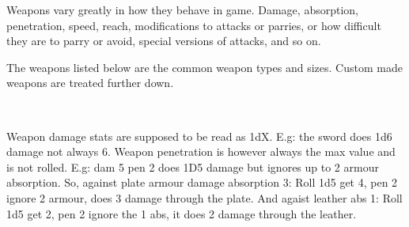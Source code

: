 Weapons vary greatly in how they behave in game. Damage, absorption, penetration, speed, reach, modifications to attacks or parries, or how difficult they are to parry or avoid, special versions of attacks, and so on.

The weapons listed below are the common weapon types and sizes. Custom made weapons are treated further down. 

\

Weapon damage stats are supposed to be read as 1dX. E.g: the sword does 1d6 damage not always 6. Weapon penetration is however always the max value and is not rolled. E.g: dam 5 pen 2 does 1D5 damage but ignores up to 2 armour absorption. So, against plate armour damage absorption 3: Roll 1d5 get 4, pen 2 ignore 2 armour, does 3 damage through the plate. And agaist leather abs 1: Roll 1d5 get 2, pen 2 ignore the 1 abs, it does 2 damage through the leather.



